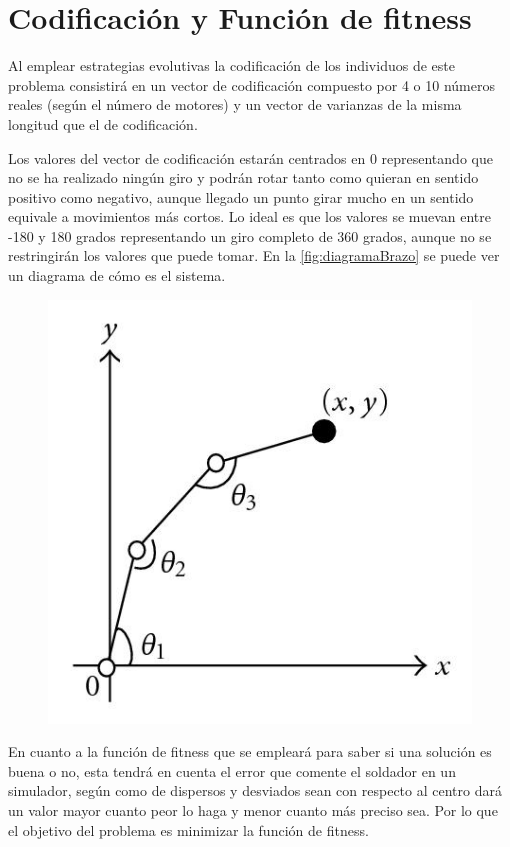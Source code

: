 \documentclass[12pt, spanish, pdftex]{UC3M_document}
\begin{document}
\section{Codificación y Función de fitness}
Al emplear estrategias evolutivas la codificación de los individuos de este problema consistirá en un vector de codificación compuesto por 4 o 10 números reales (según el número de motores) y un vector de varianzas de la misma longitud que el de codificación.

Los valores del vector de codificación estarán centrados en 0 representando que no se ha realizado ningún giro y podrán rotar tanto como quieran en sentido positivo como negativo, aunque llegado un punto girar mucho en un sentido equivale a movimientos más cortos. Lo ideal es que los valores se muevan entre -180 y 180 grados representando un giro completo de 360 grados, aunque no se restringirán los valores que puede tomar. En la \autoref{fig:diagramaBrazo} se puede ver un diagrama de cómo es el sistema.
\begin{figure}[H]
	{\includegraphics[scale=1.5]{./img/arm_angles.jpg}}
\end{figure}

En cuanto a la función de fitness que se empleará para saber si una solución es buena o no, esta tendrá en cuenta el error que comente el soldador en un simulador, según como de dispersos y desviados sean con respecto al centro dará un valor mayor cuanto peor lo haga y menor cuanto más preciso sea. Por lo que el objetivo del problema es minimizar la función de fitness.
\end{document}
